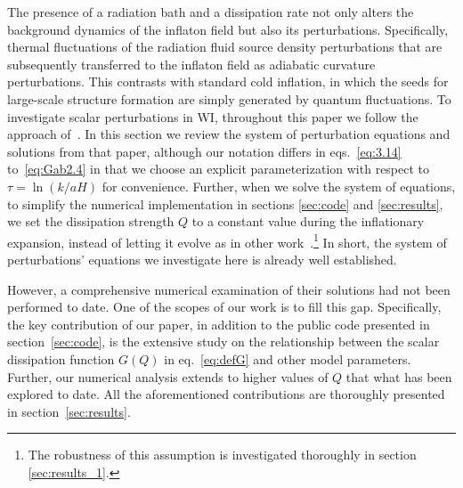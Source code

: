 \documentclass[a4paper,11pt]{article}
\begin{document}
The presence of a radiation bath and a dissipation rate not only alters the background dynamics of the inflaton field but also its perturbations. Specifically, thermal fluctuations of the radiation fluid source density perturbations that are subsequently transferred to the inflaton field as adiabatic curvature perturbations. This contrasts with standard cold inflation, in which the seeds for large-scale structure formation are simply generated by quantum fluctuations. To investigate scalar perturbations in WI, throughout this paper we follow the approach of~\cite{Ramos:2013nsa}. In this section we review the system of perturbation equations and solutions from that paper, although our notation differs in eqs.~\eqref{eq:3.14} to~\eqref{eq:Gab2.4} in that we choose an explicit parameterization with respect to $\tau=\ln(k/aH)$  for convenience.
Further, when we solve the system of equations, to simplify the numerical implementation in sections \ref{sec:code} and \ref{sec:results}, we set the dissipation strength $Q$ to a constant value during the inflationary expansion, instead of letting it evolve as in other work~\cite{Ramos:2013nsa}.\footnote{The robustness of this assumption is investigated thoroughly in section \ref{sec:results_1}.} In short, the system of perturbations' equations we investigate here is already well established. 

However, a comprehensive numerical examination of their solutions had not been performed to date. One of the scopes of our work is to fill this gap. Specifically, the key contribution of our paper, in addition to the public code presented in section~\ref{sec:code}, is the extensive study on the relationship between the scalar dissipation function $G(Q)$ in eq.~\eqref{eq:defG} and other model parameters. Further, our numerical analysis extends to higher values of $Q$ that what has been explored to date. All the aforementioned contributions are thoroughly presented in section~\ref{sec:results}. 
\end{document}
